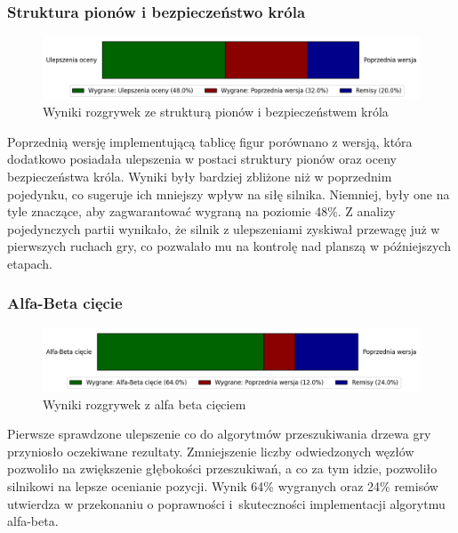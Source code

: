 \subsubsection{Struktura pionów i bezpieczeństwo króla}
\begin{figure}[ht]
    \centering
    \includegraphics[width=1\linewidth]{rozdzialy/rozdzial03/1_porownanie-wersji-silnika/rysunki/wyniki-full-eval}
    \caption{Wyniki rozgrywek ze strukturą pionów i bezpieczeństwem króla}
    \label{fig:wyniki-full-eval}
\end{figure}
Poprzednią wersję implementującą tablicę figur porównano z wersją, która dodatkowo posiadała ulepszenia w postaci struktury pionów oraz oceny bezpieczeństwa króla.
Wyniki były bardziej zbliżone niż w poprzednim pojedynku, co sugeruje ich mniejszy wpływ na siłę silnika.
Niemniej, były one na tyle znaczące, aby zagwarantować wygraną na poziomie 48\%.
Z analizy pojedynczych partii wynikało, że silnik z ulepszeniami zyskiwał przewagę już w pierwszych ruchach gry, co  pozwalało mu na kontrolę nad planszą w późniejszych etapach.


\subsubsection{Alfa-Beta cięcie}
\begin{figure}[ht]
    \centering
    \includegraphics[width=1\linewidth]{rozdzialy/rozdzial03/1_porownanie-wersji-silnika/rysunki/wyniki-alfa-beta}
    \caption{Wyniki rozgrywek z alfa beta cięciem}
    \label{fig:wyniki-alfa-beta}
\end{figure}
Pierwsze sprawdzone ulepszenie co do algorytmów przeszukiwania drzewa gry przyniosło oczekiwane rezultaty.
Zmniejszenie liczby odwiedzonych węzłów pozwoliło na zwiększenie głębokości przeszukiwań, a co za tym idzie, pozwoliło silnikowi na lepsze ocenianie pozycji.
Wynik 64\% wygranych oraz 24\% remisów utwierdza w przekonaniu o poprawności i~skuteczności implementacji algorytmu alfa-beta.


